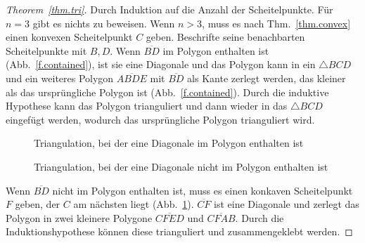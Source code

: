 \begin{proof}[Theorem~\ref{thm.tri}]
Durch Induktion auf die Anzahl der Scheitelpunkte. Für $n=3$ gibt es nichts zu beweisen. Wenn $n>3$, muss es nach Thm.~\ref{thm.convex} einen konvexen Scheitelpunkt $C$ geben. Beschrifte seine benachbarten Scheitelpunkte mit $B,D$. Wenn $\overline{BD}$ im Polygon enthalten ist (Abb.~\ref{f.contained}), ist sie eine Diagonale und das Polygon kann in ein $\triangle BCD$ und ein weiteres Polygon $\overline{ABDE}$ mit $\overline{BD}$ als Kante zerlegt werden, das kleiner als das ursprüngliche Polygon ist (Abb.~\ref{f.contained}). Durch die induktive Hypothese kann das Polygon trianguliert und dann wieder in das $\triangle BCD$ eingefügt werden, wodurch das ursprüngliche Polygon trianguliert wird.

\begin{figure}[t]
\begin{minipage}{.45\textwidth}
\begin{center}
\caption{Triangulation, bei der eine Diagonale im Polygon enthalten ist}\label{f.contained}
\end{center}
\end{minipage}
\hfill
\begin{minipage}{.45\textwidth}
\begin{center}
\caption{Triangulation, bei der eine Diagonale nicht im Polygon enthalten ist}\label{f.museum.concave-vertices}
\end{center}
\end{minipage}
\end{figure}
Wenn $\overline{BD}$ nicht im Polygon enthalten ist, muss es einen konkaven Scheitelpunkt $F$ geben, der $C$ am nächsten liegt (Abb.~\ref{f.museum.concave-vertices}). $\overline{CF}$ ist eine Diagonale und zerlegt das Polygon in zwei kleinere Polygone $\overline{CFED}$ und $\overline{CFAB}$. Durch die Induktionshypothese können diese trianguliert und zusammengeklebt werden.
\end{proof}


